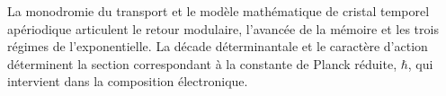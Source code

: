 La monodromie du transport et le modèle mathématique de cristal temporel
apériodique articulent le retour modulaire, l'avancée de la mémoire et les trois
régimes de l'exponentielle. La décade déterminantale et le caractère
d'action déterminent la section correspondant à la constante de Planck
réduite, \(\hbar\), qui intervient dans la composition électronique.
